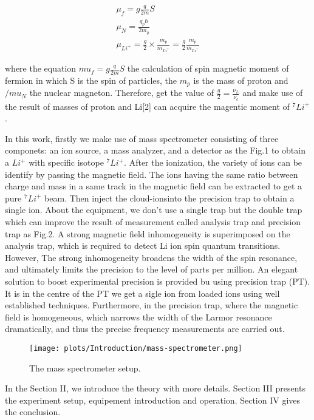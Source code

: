 \begin{align*}
\mu_{f}=g\frac{q}{2m}S \\
\mu_{N}=\frac{q_{p}\hbar}{2m_p}\\
\mu_{Li^{+}}=\frac{g}{2}\times \frac{m_{p}}{m_{Li^{+}}}=\frac{g}{2}\frac{m_p}{m_{Li^+}}
\end{align*}

where the equation $ mu_{f}=g\frac{q}{2m}S $ the calculation of spin magnetic moment of fermion in which S is the spin of particles, the $m_p$ is the mass of proton and $/mu_N$ the nuclear magneton. Therefore, get the value of $\frac{g}{2}=\frac{\nu_L}{\nu_c}$ and make use of the result of masses of proton and Li[2] can acquire the magentic moment of ${}^{7}Li^+$.  

In this work, firstly we make use of mass spectrometer consisting of three componets: an ion source, a mass analyzer, and a detector as the Fig.1 to obtain a $Li^{+}$ with specific isotope ${}^{7}Li^{+}$. After the ionization, the variety of ions can be identify by passing the magnetic field. The ions having the same ratio between charge and mass in a same track in the magnetic field can be extracted to get a pure ${}^{7}Li^{+}$ beam. Then inject the cloud-ionsinto the precision trap to obtain a single ion. About the equipment, we don't use a single trap but the double trap which can improve the result of measurement called analysis trap and precision trap as Fig.2. A strong magnetic field inhomogeneity is superimposed on the analysis trap, which is required to detect Li ion spin quantum transitions. However, The strong inhomogeneity broadens the width of the spin resonance, and ultimately limits the precision to the level of parts per million. An elegant solution to boost experimental precision is provided bu using precision trap (PT). It is in the centre of the PT we get a sigle ion from loaded ions using well established techniques. Furthermore, in the precision trap, where the magnetic field is homogeneous, which narrows the width of the Larmor resonance dramatically, and thus the precise frequency measurements are carried out.

\begin{figure}[]
\begin{center}
\texttt{[image: plots/Introduction/mass-spectrometer.png]}
\end{center}
\caption{The mass spectrometer setup.}
\label{fig:mass-spectrometer}
\end{figure}

In the Section II, we introduce the theory with more details. Section III presents the experiment setup, equipement introduction and operation. Section IV gives the conclusion.
